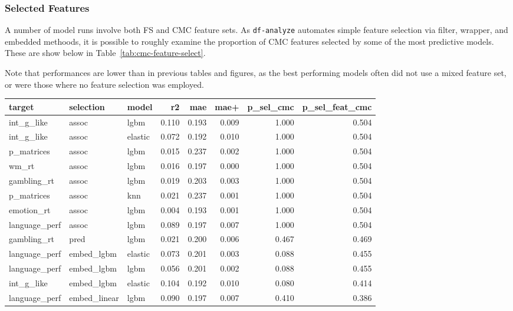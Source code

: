 \documentclass{article}
\begin{document}
\subsubsection{Selected Features}

A number of model runs involve both FS and CMC feature sets. As \texttt{df-analyze}
automates simple feature selection via filter, wrapper, and embedded
methoods, it is possible to roughly examine the proportion of CMC features
selected by some of the most predictive models. These are show below in
Table~\ref{tab:cmc-feature-select}.

Note that performances are lower than in previous tables and figures, as the best
performing models often did not use a mixed feature set, or were those where no
feature selection was employed.

\begin{table}
\centering
\begin{tabular}{lllrrrrr}
	\toprule
	target & selection & model & r2 & mae & mae+ & p\_sel\_cmc & p\_sel\_feat\_cmc \\
	\midrule
	int\_g\_like & assoc & lgbm & 0.110 & 0.193 & 0.009 & 1.000 & 0.504 \\
	int\_g\_like & assoc & elastic & 0.072 & 0.192 & 0.010 & 1.000 & 0.504 \\
	p\_matrices & assoc & lgbm & 0.015 & 0.237 & 0.002 & 1.000 & 0.504 \\
	wm\_rt & assoc & lgbm & 0.016 & 0.197 & 0.000 & 1.000 & 0.504 \\
	gambling\_rt & assoc & lgbm & 0.019 & 0.203 & 0.003 & 1.000 & 0.504 \\
	p\_matrices & assoc & knn & 0.021 & 0.237 & 0.001 & 1.000 & 0.504 \\
	emotion\_rt & assoc & lgbm & 0.004 & 0.193 & 0.001 & 1.000 & 0.504 \\
	language\_perf & assoc & lgbm & 0.089 & 0.197 & 0.007 & 1.000 & 0.504 \\
	gambling\_rt & pred & lgbm & 0.021 & 0.200 & 0.006 & 0.467 & 0.469 \\
	language\_perf & embed\_lgbm & elastic & 0.073 & 0.201 & 0.003 & 0.088 & 0.455 \\
	language\_perf & embed\_lgbm & lgbm & 0.056 & 0.201 & 0.002 & 0.088 & 0.455 \\
	int\_g\_like & embed\_lgbm & elastic & 0.104 & 0.192 & 0.010 & 0.080 & 0.414 \\
	language\_perf & embed\_linear & lgbm & 0.090 & 0.197 & 0.007 & 0.410 & 0.386 \\

\end{tabular}
\end{table}
\end{document}
